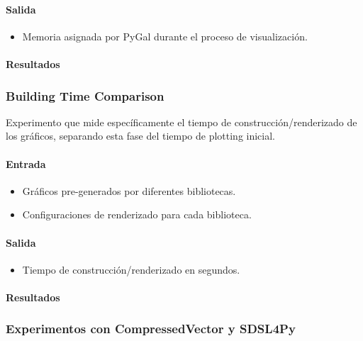 \paragraph{Salida}
\begin{itemize}
    \item Memoria asignada por PyGal durante el proceso de visualización.
\end{itemize}

\paragraph{Resultados}
\vspace{0.5em}
\noindent

\PyGalMemoryAllocation
\newpage

\subsubsection{Building Time Comparison}
\label{building_time_comparison}

Experimento que mide específicamente el tiempo de construcción/renderizado de los gráficos, separando esta fase del tiempo de plotting inicial.

\paragraph{Entrada}
\begin{itemize}
    \item Gráficos pre-generados por diferentes bibliotecas.
    \item Configuraciones de renderizado para cada biblioteca.
\end{itemize}

\paragraph{Salida}
\begin{itemize}
    \item Tiempo de construcción/renderizado en segundos.
\end{itemize}

\paragraph{Resultados}
\vspace{0.5em}
\noindent

\BuildingTimeComparison
\newpage

\subsubsection{Experimentos con CompressedVector y SDSL4Py}
\label{anexo_sdsl4py}

